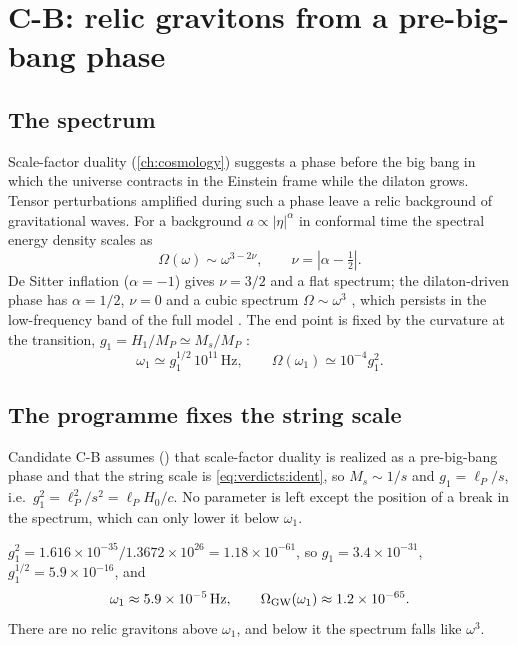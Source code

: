 \section{C-B: relic gravitons from a pre-big-bang phase}\label{sec:verdicts:cb}

\subsection{The spectrum}

Scale-factor duality (\cref{ch:cosmology}) suggests a phase before the big bang in which the
universe contracts in the Einstein frame while the dilaton grows. Tensor perturbations amplified
during such a phase leave a relic background of gravitational waves. For a background
$a\propto|\eta|^\alpha$ in conformal time the spectral energy density scales as
\begin{equation}\label{eq:verdicts:slope}
 \Omega(\omega)\sim\omega^{3-2\nu},\qquad \nu=\left|\alpha-\tfrac12\right| .
\end{equation}
De Sitter inflation ($\alpha=-1$) gives $\nu=3/2$ and a flat spectrum; the dilaton-driven phase has
$\alpha=1/2$, $\nu=0$ and a cubic spectrum $\Omega\sim\omega^3$ ,
which persists in the low-frequency band of the full model . The end point is fixed by the curvature at the transition,
$g_1=H_1/M_P\simeq M_s/M_P$ :
\begin{equation}\label{eq:verdicts:end}
 \omega_1\simeq g_1^{1/2}\,10^{11}\,\text{Hz},\qquad \Omega(\omega_1)\simeq10^{-4}g_1^2 .
\end{equation}

\subsection{The programme fixes the string scale}

Candidate C-B assumes (\TC) that scale-factor duality is realized as a pre-big-bang phase and
that the string scale is \eqref{eq:verdicts:ident}, so $M_s\sim1/s$ and
$g_1=\ell_P/s$, i.e.\ $g_1^2=\ell_P^2/s^2=\ell_P H_0/c$. No parameter is left except the position
of a break in the spectrum, which can only lower it below $\omega_1$.

\begin{example}
$g_1^2=1.616\times10^{-35}/1.3672\times10^{26}=1.18\times10^{-61}$, so $g_1=3.4\times10^{-31}$,
$g_1^{1/2}=5.9\times10^{-16}$, and
\[
 \omega_1\approx5.9\times10^{-5}\,\text{Hz},\qquad \Omega_{\rm GW}(\omega_1)\approx1.2\times10^{-65}.
\]
There are no relic gravitons above $\omega_1$, and below it the spectrum falls like $\omega^3$.
\end{example}

